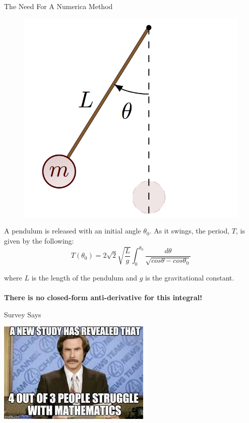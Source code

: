 \documentclass[t]{beamer}
\begin{document}
\begin{frame}{The Need For A Numerica Method}

\begin{multicols}{2}
\begin{figure}
    \centering
    \includegraphics[width=0.7\linewidth]{pendulum.png}
\end{figure}

\vfill\null
\columnbreak

A pendulum is released with an initial angle $\theta_0$. As it swings, the period, $T$, is given by the following:
\pause
\[T(\theta_0)=2\sqrt{2}\sqrt{\frac{L}{g}}\int_0^{\theta_0} \frac{d\theta}{\sqrt{cos \theta - cos \theta_0}}\]

where $L$ is the length of the pendulum and $g$ is the gravitational constant.
\pause
\\
\\
\textbf{There is no closed-form anti-derivative for this integral!}
\end{multicols}
\end{frame}

\begin{frame}{Survey Says}
	\begin{center}
		\includegraphics[scale=0.7]{assets/4-out-of-3-math}
	\end{center}
\end{frame}
\end{document}
